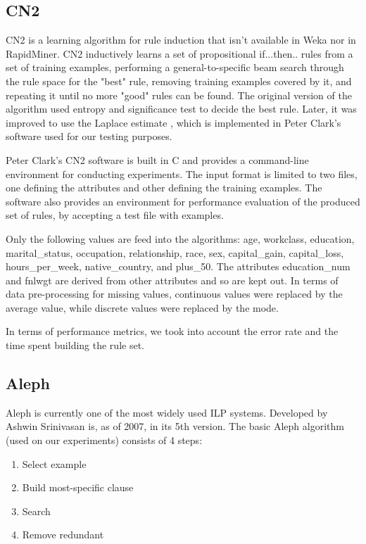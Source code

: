 \documentclass[a4paper]{llncs}
\begin{document}
\subsection{CN2}

CN2 \cite{cn2} is a learning algorithm for rule induction \cite{rule_induction}
that isn't available in Weka nor in RapidMiner. CN2 inductively learns a set of
propositional if...then.. rules from a set of training examples, performing a
general-to-specific beam search through the rule space for the "best" rule, 
removing training examples covered by it, and repeating it until no more "good"
rules can be found. The original version of the algorithm used entropy and
significance test to decide the best rule. Later, it was improved to use the
Laplace estimate \cite{cn2_laplace}, which is implemented in Peter Clark's 
software used for our testing purposes.

Peter Clark's CN2 software is built in C and provides a command-line environment
for conducting experiments. The input format is limited to two files, one
defining the attributes and other defining the training examples. The software 
also provides an environment for performance evaluation of the produced set of 
rules, by accepting a test file with examples.

Only the following values are feed into the algorithms: age, workclass, 
education, marital\_status, occupation, relationship, race, sex, capital\_gain,
capital\_loss, hours\_per\_week, native\_country, and plus\_50. The attributes
education\_num and fnlwgt are derived from other attributes and so are kept out.
In terms of data pre-processing for missing values, continuous values were 
replaced by the average value, while discrete values were replaced by the mode.

In terms of performance metrics, we took into account the error rate and the 
time spent building the rule set. 

\subsection{Aleph}

Aleph \cite{aleph} is currently one of the most widely used ILP \cite{ilp} 
systems. Developed by Ashwin Srinivasan is, as of 2007, in its 5th version. The
basic Aleph algorithm (used on our experiments) consists of 4 steps:

\begin{enumerate}
    \item{Select example}
    \item{Build most-specific clause}
    \item{Search}
    \item{Remove redundant}
\end{enumerate}
\end{document}
